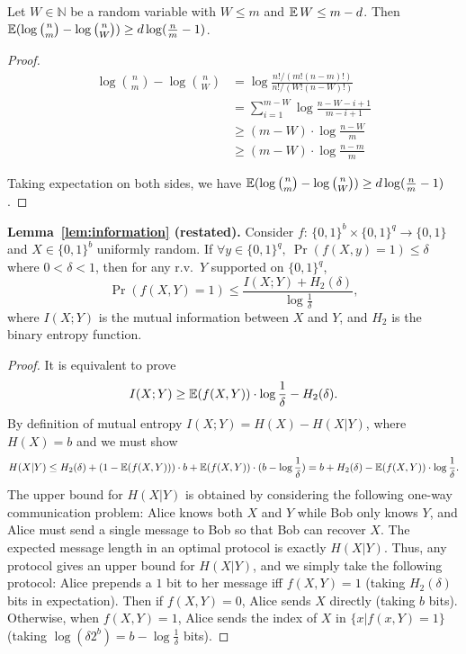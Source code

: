 \begin{lemma} \label{lemma:bits-saving}
Let $W\in \mathbb{N}$ be a random variable with $W\le m$ and $\operatorname*{\mathbb{E}} W\le m-d$. Then $\operatorname*{\mathbb{E}}(\log {n \choose m}-\log {n \choose W})\ge d \log (\frac{n}{m}-1)$.
\end{lemma}

\begin{proof}
  \begin{align*}
  \log {n \choose m}-\log {n \choose W}
  &= \log \frac{n!/(m!(n-m)!)}{n!/(W!(n-W)!)} \\
  &= \sum_{i=1}^{m-W}\log \frac{n-W-i+1}{m-i+1} \\
  &\ge (m-W)\cdot \log \frac{n-W}{m} \\
  &\ge (m-W)\cdot \log \frac{n-m}{m}
  \end{align*}
  
  Taking expectation on both sides, we have $\operatorname*{\mathbb{E}}(\log {n \choose m}-\log {n \choose W})\ge d \log (\frac{n}{m}-1)$. 
\end{proof}

\noindent \textbf{Lemma~\ref{lem:information} (restated).}
  Consider $f$: $\{0,1\}^b\times \{0,1\}^q\rightarrow \{0,1\}$ and $X\in\{0,1\}^b$ uniformly random. If $\forall y\in \{0,1\}^q,\ \Pr(f(X,y)=1)\le \delta$ where $0<\delta<1$, then for any r.v.\ $Y$ supported on $\{0,1\}^q$,
$$
  \Pr(f(X,Y)=1)\le \frac{I(X;Y)+H_2(\delta)}{\log \frac{1}{\delta}} ,
$$
  where $I(X;Y)$ is the mutual information between $X$ and $Y$, and $H_2$ is the binary entropy function.
\begin{proof}
  It is equivalent to prove 
$$I(X;Y)\ge \operatorname*{\mathbb{E}}(f(X,Y))\cdot \log\frac{1}{\delta}-H_2(\delta).$$
By definition of mutual entropy $I(X;Y)=H(X)-H(X|Y)$, where $H(X)=b$ and we must show
$$H(X|Y)\le H_2(\delta)+(1-\operatorname*{\mathbb{E}}(f(X,Y)))\cdot b+\operatorname*{\mathbb{E}}(f(X,Y))\cdot (b-\log\frac{1}{\delta})=b+H_2(\delta)-\operatorname*{\mathbb{E}}(f(X,Y))\cdot \log\frac{1}{\delta} .$$
  The upper bound for $H(X|Y)$ is obtained by considering the following one-way communication problem: Alice knows both $X$ and $Y$ while Bob only knows $Y$, and Alice must send a single message to Bob so that Bob can recover $X$. The expected message length in an optimal protocol is exactly $H(X|Y)$.  Thus, any protocol gives an upper bound for $H(X|Y)$, and we simply take the following protocol: Alice prepends a $1$ bit to her message iff $f(X,Y) = 1$ (taking $H_2(\delta)$ bits in expectation). Then if $f(X,Y)=0$, Alice sends $X$ directly (taking $b$ bits). Otherwise, when $f(X,Y)=1$, Alice sends the index of $X$ in $\{x|f(x,Y)=1\}$ (taking $\log (\delta 2^b)=b-\log\frac{1}{\delta}$ bits).  
\end{proof}

